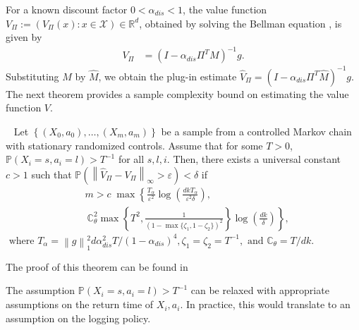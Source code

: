 \documentclass[opre,sglanonrev]{informs4}
\numberwithin{equation}{section}
\newcommand{\lp}{\left(}
\newcommand{\rp}{\right)}
\newcommand{\lc}{\left\{}
\newcommand{\rc}{\right\}}
\newcommand{\lV}{\left\|}
\newcommand{\rV}{\right\|}
\newcommand{\ldot}{\left.}
\newcommand{\rdot}{\right.}
\newcommand{\Cbb}{\mathbb{C}}
\newcommand{\Pbb}{\mathbb{P}}
\newcommand{\constant}{\Cbb}
\newcommand{\indexeddata}{\left\{(X_0,a_0),\dots,(X_m,a_m)\right\}}
\newcommand{\prob}{\Pbb}
\newcommand{\eps}{\varepsilon}
\renewcommand{\epsilon}{\eps}
\begin{document}
{{For a known discount factor $0<\alpha_{dis}<1$, the value function $V_\Pi := (V_\Pi(x) : x \in \mathcal{X}) \in \mathbb R^d$,
obtained by solving the Bellman equation \citep{bertsekas2011dynamic}, is given by
\begin{align*}
V_\Pi &= \lp I-\alpha_{dis} \Pi^TM \rp^{-1} g.
\end{align*}
Substituting $M$ by $\hat M$, we obtain the plug-in estimate $\hat V_\Pi = \lp I-\alpha_{dis} \Pi^T\hat M \rp^{-1}g $.
%
%
 The next theorem provides a sample complexity bound on estimating the value function $V$.
\begin{theorem}~\label{thm:value-thm}
Let $\indexeddata$ be a sample from a controlled Markov chain with stationary randomized controls. Assume that for some $T>0$,  $\prob\lp X_i=s,a_i=l \rp >T^{-1}$ for all $s,l,i$. Then, there exists a universal constant $c>1$ such that $\prob\lp\lV \hat V_\Pi - V_\Pi\rV_\infty>\eps\rp<\delta
$ if
\begin{align*}
    &m>c \; \max\left\{\frac{T_\alpha}{\eps^2}\log\lp\frac{dkT_\alpha}{\epsilon^2\delta} \rp, \rdot\\&\ \ldot\constant_\theta^2\max\lc {T}^2, \frac{1}{\lp 1-\max\{\zeta_1,1-\zeta_2\}\rp^2}\rc \log\lp \frac{dk}{\delta} \rp\right\},
\end{align*}
$ \text{ where } T_\alpha = {\lV g\rV_{1}^2 d\alpha_{dis}^2 T}/{(1-\alpha_{dis})^4}, \zeta_1=\zeta_2=T^{-1}, \text{ and } \constant_\theta  = T/dk.$
\end{theorem}
The proof of this theorem can be found in 
}
\begin{remark}
    The assumption $\prob\lp X_i=s,a_i=l \rp >T^{-1}$ can be relaxed with appropriate assumptions on the return time of $X_i,a_i$. In practice, this would translate to an assumption on the logging policy. 
\end{remark}

}
\end{document}
